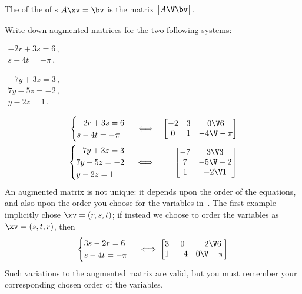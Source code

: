\begin{definition} \label{def:augmat}
The  of the  of s \(A\xv=\bv\) is the matrix \(\begin{bmatrix} A\V \bv \end{bmatrix}\).
\end{definition}

\begin{example} \label{eg:}
Write down augmented matrices for the two following systems:
\begin{parts}
\item \(\begin{array}{l} -2r+3s=6\,,\\s-4t=-\pi\,, \end{array}\)
\item \(\begin{array}{l}
-7y+3z=3\,,\\7y-5z=-2\,,\\y-2z=1\,.
\end{array}\)
\end{parts}
\begin{solution} 
\begin{eqnarray*}
\begin{cases} -2r+3s=6\\s-4t=-\pi \end{cases}
&\iff&%
\begin{bmatrix} -2&3&0\V6\\ 0&1&-4\V-\pi \end{bmatrix}
\\
\begin{cases}
-7y+3z=3\\7y-5z=-2\\y-2z=1
\end{cases}
&\iff&%
\begin{bmatrix} -7&3\V3\\ 7&-5\V-2\\1&-2\V1 \end{bmatrix}
\end{eqnarray*} 
An augmented matrix is not unique: it depends upon the order of the equations, and also upon the order you choose for the variables in~\xv.  
The first example implicitly chose \(\xv=(r,s,t)\); if instead we choose to order the variables as \(\xv=(s,t,r)\), then  
\begin{equation*}
\begin{cases} 3s-2r=6\\s-4t=-\pi \end{cases}
\iff%
\begin{bmatrix} 3&0&-2\V6\\ 1&-4&0\V-\pi \end{bmatrix}
\end{equation*} 
Such variations to the augmented matrix are valid, but you must remember your corresponding chosen order of the variables.
\end{solution}
\end{example}


